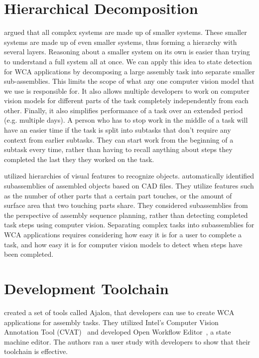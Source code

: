 \section{Hierarchical Decomposition}

\citet{Simon1991} argued that all complex systems are made up of smaller
systems. These smaller systems are made up of even smaller systems, thus
forming a hierarchy with several layers.
Reasoning about a smaller system on its own is easier than trying to understand
a full system all at once.
We can apply this idea to state detection for WCA applications by decomposing
a large assembly task into separate smaller sub-assemblies.
This limits the scope of what any one computer vision model that we use is
responsible for.
It also allows multiple developers to work on computer vision models for
different parts of the task completely independently from each other.
Finally, it also simplifies performance of a task over an extended period
(e.g. multiple days). A person who has to stop work in the middle of a task will
have an easier time if the task is split into subtasks that don't require any
context from earlier subtasks. They can start work from the beginning of a
subtask every time, rather than having to recall anything about steps they
completed the last they they worked on the task.

\citet{semantic_hierarchy} utilized hierarchies of visual features to recognize
objects.
\citet{subassembly_identification} automatically identified subassemblies of
assembled objects based on CAD files.
They utilize features such as the number of other parts that a certain part
touches, or the amount of surface area that two touching parts share.
They considered subassemblies from the perspective of assembly sequence
planning, rather than detecting completed task steps using computer vision.
Separating complex tasks into subassemblies for WCA applications requires
considering how easy it is for a user to complete a task, and how easy it is for
computer vision models to detect when steps have been completed.

\section{Development Toolchain}

\citet{pham2021ajalon} created a set of tools called Ajalon, that developers can
use to create WCA applications for assembly tasks.
They utilized Intel's Computer Vision Annotation Tool (CVAT)~{\cite{CVAT}} and
developed Open Workflow Editor~{\cite{workflow}}, a state machine editor.
The authors ran a user study with developers to show that their toolchain is
effective.
